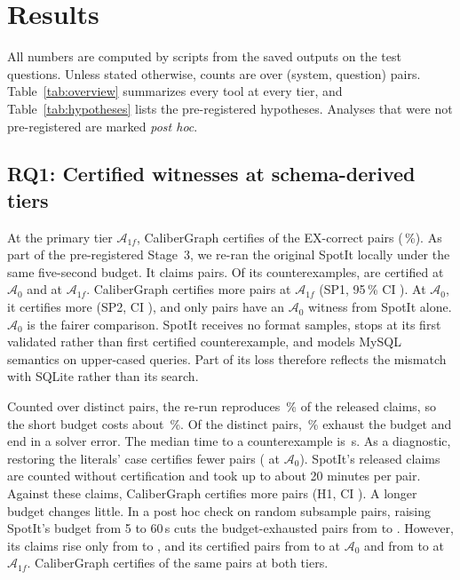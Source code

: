 \section{Results}\label{sec:results}

All numbers are computed by scripts from the saved outputs on the test questions. Unless stated otherwise, counts are over (system, question) pairs. Table~\ref{tab:overview} summarizes every tool at every tier, and Table~\ref{tab:hypotheses} lists the pre-registered hypotheses. Analyses that were not pre-registered are marked \emph{post hoc}.




\subsection{RQ1: Certified witnesses at schema-derived tiers}\label{sec:main}
At the primary tier $\mathcal A_{1f}$, CaliberGraph certifies  of the  EX-correct pairs (\,\%). As part of the pre-registered Stage~3, we re-ran the original SpotIt locally under the same five-second budget. It claims  pairs. Of its counterexamples,  are certified at $\mathcal A_0$ and  at $\mathcal A_{1f}$. CaliberGraph certifies  more pairs at $\mathcal A_{1f}$ (SP1, 95\,\% CI ). At $\mathcal A_0$, it certifies  more (SP2, CI ), and only  pairs have an $\mathcal A_0$ witness from SpotIt alone. $\mathcal A_0$ is the fairer comparison. SpotIt receives no format samples, stops at its first validated rather than first certified counterexample, and models MySQL semantics on upper-cased queries. Part of its loss therefore reflects the mismatch with SQLite rather than its search.

Counted over distinct pairs, the re-run reproduces \,\% of the released claims, so the short budget costs about \,\%. Of the distinct pairs, \,\% exhaust the budget and  end in a solver error. The median time to a counterexample is \,s. As a diagnostic, restoring the literals' case certifies fewer pairs ( at $\mathcal A_0$). SpotIt's released claims are counted without certification and took up to about 20 minutes per pair. Against these claims, CaliberGraph certifies  more pairs (H1, CI ). A longer budget changes little. In a post hoc check on  random subsample pairs, raising SpotIt's budget from 5 to 60\,s cuts the budget-exhausted pairs from  to . However, its claims rise only from  to , and its certified pairs from  to  at $\mathcal A_0$ and from  to  at $\mathcal A_{1f}$. CaliberGraph certifies  of the same pairs at both tiers.

